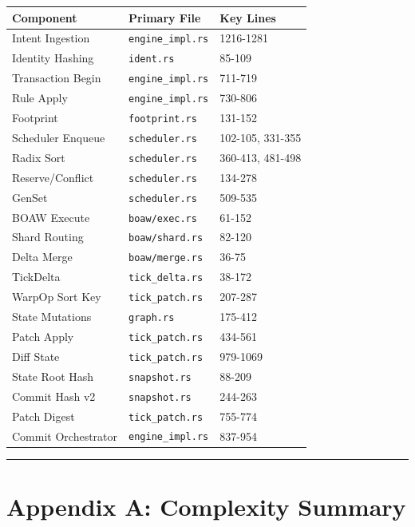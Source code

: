 \documentclass[11pt]{book}
\newcounter{none} %
\begin{document}
{\def\LTcaptype{none} %
\begin{longtable}[]{@{}lll@{}}
\toprule\noalign{}
Component & Primary File & Key Lines \\
\midrule\noalign{}
\endhead
\bottomrule\noalign{}
\endlastfoot
Intent Ingestion & \texttt{engine\_impl.rs} & 1216-1281 \\
Identity Hashing & \texttt{ident.rs} & 85-109 \\
Transaction Begin & \texttt{engine\_impl.rs} & 711-719 \\
Rule Apply & \texttt{engine\_impl.rs} & 730-806 \\
Footprint & \texttt{footprint.rs} & 131-152 \\
Scheduler Enqueue & \texttt{scheduler.rs} & 102-105, 331-355 \\
Radix Sort & \texttt{scheduler.rs} & 360-413, 481-498 \\
Reserve/Conflict & \texttt{scheduler.rs} & 134-278 \\
GenSet & \texttt{scheduler.rs} & 509-535 \\
BOAW Execute & \texttt{boaw/exec.rs} & 61-152 \\
Shard Routing & \texttt{boaw/shard.rs} & 82-120 \\
Delta Merge & \texttt{boaw/merge.rs} & 36-75 \\
TickDelta & \texttt{tick\_delta.rs} & 38-172 \\
WarpOp Sort Key & \texttt{tick\_patch.rs} & 207-287 \\
State Mutations & \texttt{graph.rs} & 175-412 \\
Patch Apply & \texttt{tick\_patch.rs} & 434-561 \\
Diff State & \texttt{tick\_patch.rs} & 979-1069 \\
State Root Hash & \texttt{snapshot.rs} & 88-209 \\
Commit Hash v2 & \texttt{snapshot.rs} & 244-263 \\
Patch Digest & \texttt{tick\_patch.rs} & 755-774 \\
Commit Orchestrator & \texttt{engine\_impl.rs} & 837-954 \\
\end{longtable}
}

\begin{center}\rule{0.5\linewidth}{0.5pt}\end{center}

\section{Appendix A: Complexity
Summary}\label{appendix-a-complexity-summary}
\end{document}
